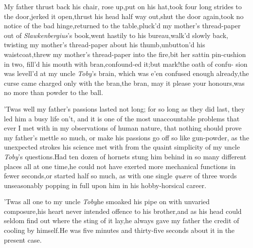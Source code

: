 \documentclass{article}
\begin{document}
\tsh My father thrust back his chair,\break
\tsh rose up,\tsk put on his
hat,\tsk took four long strides to the
door,\tsk jerked it open,\tsk thrust his head half
way out,\tsk shut the door again,\tsk took no
notice of the bad hinge,\tsk returned to the
table,\tsk\break pluck’d my mother’s thread-paper out of
\textit{Slawkenbergius}’s book,\tsk went hastily to his
bureau,\tsk walk’d slowly back, twisting my mother’s
thread-paper about his thumb,\tsk unbutton’d his
waistcoat,\tsh threw my mother’s thread-paper into the
fire,\tsk bit her sattin pin-cushion in two, fill’d
his mouth with bran,\tsk confound-\break ed it;\tsk but mark!\tsk the
oath of confu- sion was levell’d at my uncle
\textit{Toby}’s brain,\break
\tsh which was e’en confused enough already,\tsh the curse
came charged only with the bran,\tsk the bran, may it please
your honours,\tsk was no more than powder to the ball.

’Twas well my father’s passions lasted not long; for
so long as they did last, they led him a busy life on’t, and
it is one of the most unaccountable problems that ever I met with
in my observations of human nature, that nothing should prove my
father’s mettle so much, or make his passions go off so like
gun-powder, as the unexpected strokes his science met with from the
quaint simplicity of my uncle \textit{Toby}’s
questions.\tsh Had ten dozen of hornets stung him behind
in so many different places all at one time,\tsk he could not have
exerted more mechanical functions in fewer seconds,\tsk or
started half so much, as with one single \textit{quære} of
three words unseasonably popping in full upon him in his
hobby-horsical career.

’Twas all one to my uncle \textit{Toby}\tsk he
smoaked his pipe on with unvaried composure,\tsk his heart
never intended offence to his brother,\tsk and as his head could
seldom find out where the sting of it lay,\break\tsh he always
gave my father the credit of cooling by himself.\tsh He
was five minutes and thirty-five seconds about it in the present
case.
\end{document}
